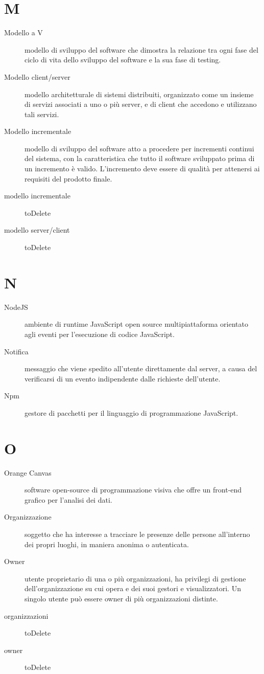 \documentclass{article}
\begin{document}
	\section{M}
	\begin{description}
		\item[Modello a V] modello di sviluppo del software che dimostra la relazione tra ogni fase del ciclo di vita dello sviluppo del software e la sua fase di testing.
		\item[Modello client/server] modello architetturale di sistemi distribuiti, organizzato come un insieme di servizi associati a uno o più server, e di client che accedono e utilizzano tali servizi.
		\item[Modello incrementale] modello di sviluppo del software atto a procedere per incrementi continui del sistema, con la caratteristica che tutto il software sviluppato prima di un incremento è valido. L'incremento deve essere di qualità per attenersi ai requisiti del prodotto finale.
		\item[modello incrementale] toDelete
		\item[modello server/client] toDelete
	\end{description}
	\section{N}
	\begin{description}
		\item[NodeJS] ambiente di runtime JavaScript open source multipiattaforma orientato agli eventi per l'esecuzione di codice JavaScript.
		\item[Notifica] messaggio che viene spedito all'utente direttamente dal server, a causa del verificarsi di un evento indipendente dalle richieste dell'utente.
		\item[Npm] gestore di pacchetti per il linguaggio di programmazione JavaScript.
	\end{description}
	\section{O}
	\begin{description}
		\item[Orange Canvas] software open-source di programmazione visiva che offre un front-end grafico per l'analisi dei dati.
		\item[Organizzazione] soggetto che ha interesse a tracciare le presenze delle persone all'interno dei propri luoghi, in maniera anonima o autenticata.
		\item[Owner] utente proprietario di una o più organizzazioni, ha privilegi di gestione dell'organizzazione su cui opera e dei suoi gestori e visualizzatori. Un singolo utente può essere owner di più organizzazioni distinte.
		\item[organizzazioni] toDelete
		\item[owner] toDelete
	\end{description}
\end{document}
